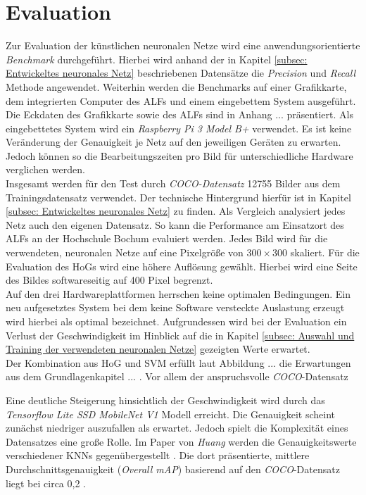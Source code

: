 \chapter{Evaluation}
\label{ch: Verifikation}
Zur Evaluation der künstlichen neuronalen Netze wird eine anwendungsorientierte \textit{Benchmark} durchgeführt. Hierbei wird anhand der in Kapitel \ref{subsec: Entwickeltes neuronales Netz} beschriebenen Datensätze die \textit{Precision} und \textit{Recall} Methode angewendet. Weiterhin werden die Benchmarks auf einer Grafikkarte, dem integrierten Computer des ALFs und einem eingebettem System ausgeführt. Die Eckdaten des Grafikkarte sowie des ALFs sind in Anhang ... präsentiert. Als eingebettetes System wird ein \textit{Raspberry Pi 3 Model B+} verwendet. Es ist keine Veränderung der Genauigkeit je Netz auf den jeweiligen Geräten zu erwarten. Jedoch können so die Bearbeitungszeiten pro Bild für unterschiedliche Hardware verglichen werden. \\

Insgesamt werden für den Test durch \textit{COCO-Datensatz} 12755 Bilder aus dem Trainingsdatensatz verwendet. Der technische Hintergrund hierfür ist in Kapitel \ref{subsec: Entwickeltes neuronales Netz} zu finden. Als Vergleich analysiert jedes Netz auch den eigenen Datensatz. So kann die Performance am Einsatzort des ALFs an der Hochschule Bochum evaluiert werden. Jedes Bild wird für die verwendeten, neuronalen Netze auf eine Pixelgröße von $300 \times 300$ skaliert. Für die Evaluation des HoGs wird eine höhere Auflösung gewählt. Hierbei wird eine Seite des Bildes softwareseitig auf 400 Pixel begrenzt.\\

Auf den drei Hardwareplattformen herrschen keine optimalen Bedingungen. Ein neu aufgesetztes System bei dem keine Software versteckte Auslastung erzeugt wird hierbei als optimal bezeichnet. Aufgrundessen wird bei der Evaluation ein Verlust der Geschwindigkeit im Hinblick auf die in Kapitel \ref{subsec: Auswahl und Training der verwendeten neuronalen Netze} gezeigten Werte erwartet.   \\
 


Der Kombination aus HoG und SVM erfüllt laut Abbildung ... die Erwartungen aus dem Grundlagenkapitel ... . Vor allem der anspruchsvolle \textit{COCO}-Datensatz 




Eine deutliche Steigerung hinsichtlich der Geschwindigkeit wird durch das \textit{Tensorflow Lite SSD MobileNet V1} Modell erreicht. Die Genauigkeit scheint zunächst niedriger auszufallen als erwartet. Jedoch spielt die Komplexität eines Datensatzes eine große Rolle. Im Paper von \textit{Huang} werden die Genauigkeitswerte verschiedener KNNs gegenübergestellt \cite{maxssdmobilenet}. Die dort präsentierte, mittlere Durchschnittsgenauigkeit (\textit{Overall mAP}) basierend auf den \textit{COCO}-Datensatz liegt bei circa 0,2 \cite{maxssdmobilenet}. 

